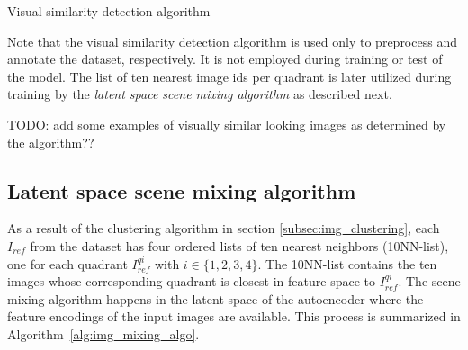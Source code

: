 \documentclass[12pt,a4paper]{article}
\begin{document}
\begin{algorithm}[H]
\DontPrintSemicolon
\LinesNumbered
{}
\caption{Visual similarity detection algorithm}\label{alg:vis_sim_det_algo}
\end{algorithm}

Note that the visual similarity detection algorithm is used only to preprocess and annotate the dataset, respectively. It is not employed during training or test of the model. The list of ten nearest image ids per quadrant is later utilized during training by the \textit{latent space scene mixing algorithm} as described next.

TODO: add some examples of visually similar looking images as determined by the algorithm??


\subsection{Latent space scene mixing algorithm} \label{subsec:img_mixing_algo}
As a result of the clustering algorithm in section \ref{subsec:img_clustering}, each $I_{ref}$ from the dataset has four ordered lists of ten nearest neighbors (10NN-list), one for each quadrant $I^{qi}_{ref}$ with $i \in \{1,2,3,4\}$. The 10NN-list contains the ten images whose corresponding quadrant is closest in feature space to $I^{qi}_{ref}$. The scene mixing algorithm happens in the latent space of the autoencoder where the feature encodings of the input images are available. This process is summarized in Algorithm~\ref{alg:img_mixing_algo}. 
\end{document}
